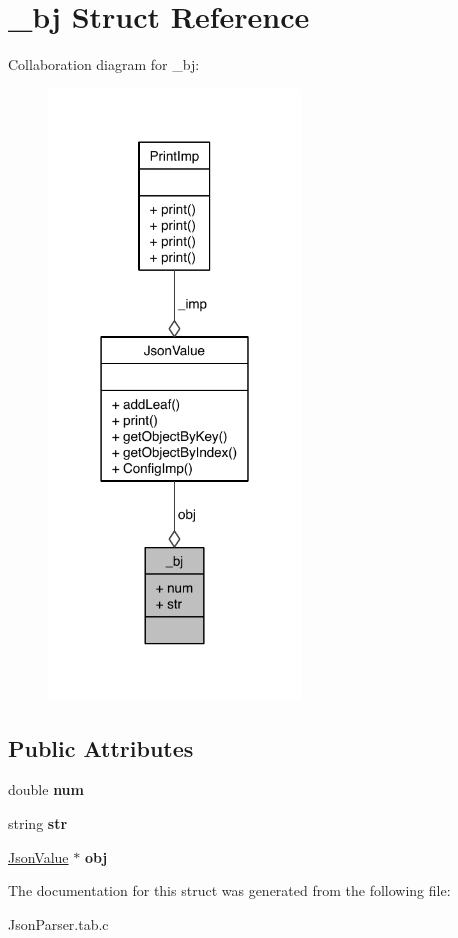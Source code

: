 \hypertarget{struct__bj}{\section{\-\_\-bj Struct Reference}
\label{struct__bj}
}


Collaboration diagram for \-\_\-bj\-:
\nopagebreak
\begin{figure}[H]
\begin{center}
\leavevmode
\includegraphics[width=190pt]{struct__bj__coll__graph}
\end{center}
\end{figure}
\subsection*{Public Attributes}
\begin{DoxyCompactItemize}
\item 
\hypertarget{struct__bj_ad8a77a8d790e029cce636b93124f103f}{double {\bfseries num}}\label{struct__bj_ad8a77a8d790e029cce636b93124f103f}

\item 
\hypertarget{struct__bj_a54e511054389a64771b91969852149d9}{string {\bfseries str}}\label{struct__bj_a54e511054389a64771b91969852149d9}

\item 
\hypertarget{struct__bj_a832111969ba497a0a7ab52ae982b671b}{\hyperlink{class_json_value}{Json\-Value} $\ast$ {\bfseries obj}}\label{struct__bj_a832111969ba497a0a7ab52ae982b671b}

\end{DoxyCompactItemize}


The documentation for this struct was generated from the following file\-:\begin{DoxyCompactItemize}
\item 
Json\-Parser.\-tab.\-c\end{DoxyCompactItemize}
